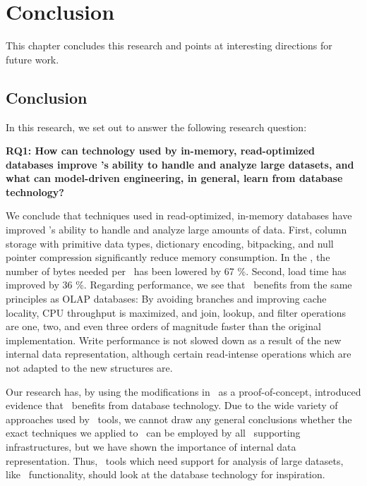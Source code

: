 \chapter{Conclusion}
\label{chap:Conclusion}

This chapter concludes this research and points at interesting directions for future work.

\clearpage

\section{Conclusion}
\label{sec:Conclusion}

In this research, we set out to answer the following research question:

\setlength{\leftskip}{1cm}

\textbf{RQ1: How can technology used by in-memory, read-optimized databases improve \gap's ability to handle and analyze large datasets, and what can model-driven engineering, in general, learn from database technology?}

\setlength{\leftskip}{0pt}

We conclude that techniques used in read-optimized, in-memory databases have improved \gap's ability to handle and analyze large amounts of data. First, column storage with primitive data types, dictionary encoding, bitpacking, and null pointer compression significantly reduce memory consumption. In the \tpchdl, the number of bytes needed per \lineitem~has been lowered by 67 \%. Second, load time has improved by 36 \%. Regarding performance, we see that \gap~benefits from the same principles as OLAP databases: By avoiding branches and improving cache locality, CPU throughput is maximized, and join, lookup, and filter operations are one, two, and even three orders of magnitude faster than the original implementation. Write performance is not slowed down as a result of the new internal data representation, although certain read-intense operations which are not adapted to the new structures are.

Our research has, by using the modifications in \gap~as a proof-of-concept, introduced evidence that \mde~benefits from database technology. Due to the wide variety of approaches used by \mdd~tools, we cannot draw any general conclusions whether the exact techniques we applied to \gap~can be employed by all \mde~supporting infrastructures, but we have shown the importance of internal data representation. Thus, \mde~tools which need support for analysis of large datasets, like \bd~functionality, should look at the database technology for inspiration. 

